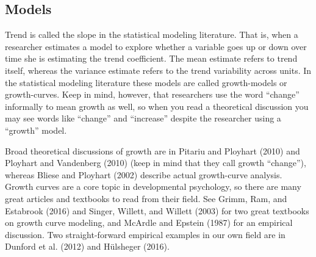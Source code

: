\documentclass[english,,man]{apa6}
\begin{document}
\hypertarget{models}{%
\subsection{Models}\label{models}}

Trend is called the slope in the statistical modeling literature. That is, when a researcher estimates a model to explore whether a variable goes up or down over time she is estimating the trend coefficient. The mean estimate refers to trend itself, whereas the variance estimate refers to the trend variability across units. In the statistical modeling literature these models are called growth-models or growth-curves. Keep in mind, however, that researchers use the word \enquote{change} informally to mean growth as well, so when you read a theoretical discussion you may see words like \enquote{change} and \enquote{increase} despite the researcher using a \enquote{growth} model.

Broad theoretical discussions of growth are in Pitariu and Ployhart (2010) and Ployhart and Vandenberg (2010) (keep in mind that they call growth \enquote{change}), whereas Bliese and Ployhart (2002) describe actual growth-curve analysis. Growth curves are a core topic in developmental psychology, so there are many great articles and textbooks to read from their field. See Grimm, Ram, and Estabrook (2016) and Singer, Willett, and Willett (2003) for two great textbooks on growth curve modeling, and McArdle and Epstein (1987) for an empirical discussion. Two straight-forward empirical examples in our own field are in Dunford et al. (2012) and Hülsheger (2016).
\end{document}
